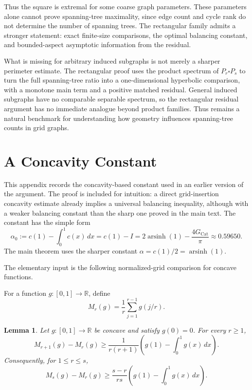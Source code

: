 \documentclass[11pt]{article}
\numberwithin{equation}{section}
\newtheorem{lemma}[lemma]{Lemma}
\DeclareMathOperator{\arsinh}{arsinh}
\newcommand{\dd}{\,d}
\begin{document}
Thus the square is extremal for some coarse graph parameters. These parameters alone cannot prove spanning-tree maximality, since edge count and cycle rank do not determine the number of spanning trees. The rectangular family admits a stronger statement: exact finite-size comparisons, the optimal balancing constant, and bounded-aspect asymptotic information from the residual.

What is missing for arbitrary induced subgraphs is not merely a sharper perimeter estimate. The rectangular proof uses the product spectrum of $P_r\square P_s$ to turn the full spanning-tree ratio into a one-dimensional hyperbolic comparison, with a monotone main term and a positive matched residual. General induced subgraphs have no comparable separable spectrum, so the rectangular residual argument has no immediate analogue beyond product families. Thus  remains a natural benchmark for understanding how geometry influences spanning-tree counts in grid graphs.




\appendix

\section{A Concavity Constant}\label{app:concavity-constant}

This appendix records the concavity-based constant used in an earlier version of the argument. The proof is included for intuition: a direct grid-insertion concavity estimate already implies a universal balancing inequality, although with a weaker balancing constant than the sharp one proved in the main text. The constant has the simple form
\[
  \alpha_0
  :=
  c(1)-\int_0^1 c(x)\dd x
  =
  c(1)-I
  =
  2\arsinh(1)-\frac{4G_{\mathrm{Cat}}}{\pi}
  \approx
  0.59650.
\]
The main theorem uses the sharper constant $\alpha=c(1)/2=\arsinh(1)$.

The elementary input is the following normalized-grid comparison for concave functions.

For a function $g:[0,1]\to\mathbb R$, define
\[
  M_r(g)=\frac1r\sum_{j=1}^{r-1}g(j/r).
\]

\begin{lemma}\label{lem:app-grid-insertion}
Let $g:[0,1]\to\mathbb R$ be concave and satisfy $g(0)=0$. For every $r\ge1$,
\[
  M_{r+1}(g)-M_r(g)
  \ge
  \frac{1}{r(r+1)}
  \left(g(1)-\int_0^1g(x)\dd x\right).
\]
Consequently, for $1\le r\le s$,
\[
  M_s(g)-M_r(g)
  \ge
  \frac{s-r}{rs}
  \left(g(1)-\int_0^1g(x)\dd x\right).
\]
\end{lemma}
\end{document}
